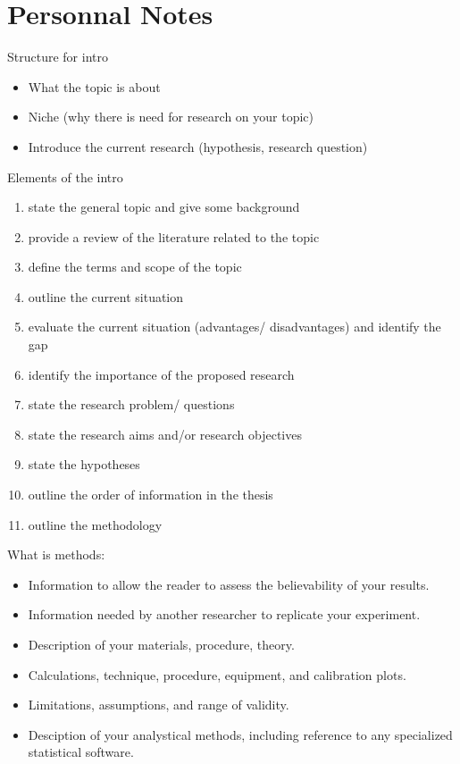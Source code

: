 \chapter{Personnal Notes}

Structure for intro
\begin{itemize}
    \item What the topic is about
    \item Niche (why there is need for research on your topic)
    \item Introduce the current research (hypothesis, research question)
\end{itemize}

Elements of the intro
\begin{enumerate}
    \item state the general topic and give some background
    \item provide a review of the literature related to the topic
    \item define the terms and scope of the topic
    \item outline the current situation
    \item evaluate the current situation (advantages/ disadvantages) and identify the gap
    \item identify the importance of the proposed research
    \item state the research problem/ questions
    \item state the research aims and/or research objectives
    \item state the hypotheses
    \item outline the order of information in the thesis
    \item outline the methodology
\end{enumerate}

What is methods:
\begin{itemize}
    \item Information to allow the reader to assess the believability of your results.
    \item Information needed by another researcher to replicate your experiment.
    \item Description of your materials, procedure, theory.
    \item Calculations, technique, procedure, equipment, and calibration plots.
    \item Limitations, assumptions, and range of validity.
    \item Desciption of your analystical methods, including reference to any specialized statistical software.
\end{itemize}
